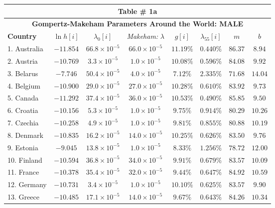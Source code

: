 \documentclass[12pt, titlepage]{article}%
\begin{document}
\clearpage
\begin{table}
\begin{center}
\begin{tabular}{||l|c|c|c|c|c|c|c||}
\hline\hline
\multicolumn{8}{||c||}{Table \# 1a } \\ \hline\hline
\multicolumn{8}{||c||}{{\bf Gompertz-Makeham Parameters Around the World: MALE}} \\ \hline\hline
{\bf Country} & $\ln h[i]$ & $\lambda_{0}[i]$ & {\em Makeham:} $\lambda$ & $g[i]$ & $\lambda_{55}[i]$ & $m$ & $b$ \\ \hline \hline
1. Australia &  $-11.854$ & $66.8\times10^{-5}$ & $66.0\times10^{-5}$ & $11.19\%$ & $0.440\%$ & $86.37$ & $8.94$\\ \hline
2. Austria &  $-10.769$ & $3.3\times10^{-5}$ & $1.0\times10^{-5}$ & $10.08\%$ & $0.596\%$ & $84.08$ & $9.92$\\ \hline
3. Belarus &  $-7.746$ & $50.4\times10^{-5}$ & $4.0\times10^{-5}$ & $7.12\%$ & $2.335\%$ & $71.68$ & $14.04$\\ \hline
4. Belgium &  $-10.900$ & $29.0\times10^{-5}$ & $27.0\times10^{-5}$ & $10.28\%$ & $0.610\%$ & $83.92$ & $9.73$\\ \hline
5. Canada &  $-11.292$ & $37.4\times10^{-5}$ & $36.0\times10^{-5}$ & $10.53\%$ & $0.490\%$ & $85.85$ & $9.50$\\ \hline
6. Croatia &  $-10.156$ & $5.3\times10^{-5}$ & $1.0\times10^{-5}$ & $9.75\%$ & $0.914\%$ & $80.29$ & $10.26$\\ \hline
7. Czechia &  $-10.258$ & $4.9\times10^{-5}$ & $1.0\times10^{-5}$ & $9.81\%$ & $0.855\%$ & $80.88$ & $10.19$\\ \hline
8. Denmark &  $-10.835$ & $16.2\times10^{-5}$ & $14.0\times10^{-5}$ & $10.25\%$ & $0.626\%$ & $83.50$ & $9.76$\\ \hline
9. Estonia &  $-9.045$ & $13.8\times10^{-5}$ & $1.0\times10^{-5}$ & $8.33\%$ & $1.256\%$ & $78.72$ & $12.00$\\ \hline
10. Finland &  $-10.594$ & $36.8\times10^{-5}$ & $34.0\times10^{-5}$ & $9.91\%$ & $0.679\%$ & $83.57$ & $10.09$\\ \hline
11. France &  $-10.378$ & $35.4\times10^{-5}$ & $32.0\times10^{-5}$ & $9.44\%$ & $0.647\%$ & $84.92$ & $10.59$\\ \hline
12. Germany &  $-10.731$ & $3.4\times10^{-5}$ & $1.0\times10^{-5}$ & $10.10\%$ & $0.625\%$ & $83.57$ & $9.90$\\ \hline
13. Greece &  $-10.485$ & $17.1\times10^{-5}$ & $14.0\times10^{-5}$ & $9.67\%$ & $0.643\%$ & $84.26$ & $10.34$\\ \hline

\end{tabular}
\end{center}
\end{table}
\end{document}
